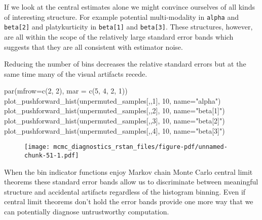 \documentclass[
  letterpaper,
  DIV=11,
  numbers=noendperiod]{scrartcl}
\newenvironment{Shaded}{\begin{snugshade}}{\end{snugshade}}
\newcommand{\AttributeTok}[1]{\textcolor[rgb]{0.40,0.45,0.13}{#1}}
\newcommand{\DecValTok}[1]{\textcolor[rgb]{0.68,0.00,0.00}{#1}}
\newcommand{\FunctionTok}[1]{\textcolor[rgb]{0.28,0.35,0.67}{#1}}
\newcommand{\NormalTok}[1]{\textcolor[rgb]{0.00,0.23,0.31}{#1}}
\newcommand{\StringTok}[1]{\textcolor[rgb]{0.13,0.47,0.30}{#1}}
\begin{document}
If we look at the central estimates alone we might convince ourselves of
all kinds of interesting structure. For example potential multi-modality
in \texttt{alpha} and \texttt{beta{[}2{]}} and platykurticity in
\texttt{beta{[}1{]}} and \texttt{beta{[}3{]}}. These structures,
however, are all within the scope of the relatively large standard error
bands which suggests that they are all consistent with estimator noise.

Reducing the number of bins decreases the relative standard errors but
at the same time many of the visual artifacts recede.

\begin{Shaded}
\begin{Highlighting}[]
\FunctionTok{par}\NormalTok{(}\AttributeTok{mfrow=}\FunctionTok{c}\NormalTok{(}\DecValTok{2}\NormalTok{, }\DecValTok{2}\NormalTok{), }\AttributeTok{mar =} \FunctionTok{c}\NormalTok{(}\DecValTok{5}\NormalTok{, }\DecValTok{4}\NormalTok{, }\DecValTok{2}\NormalTok{, }\DecValTok{1}\NormalTok{))}
\FunctionTok{plot\_pushforward\_hist}\NormalTok{(unpermuted\_samples[,,}\DecValTok{1}\NormalTok{], }\DecValTok{10}\NormalTok{, }\AttributeTok{name=}\StringTok{"alpha"}\NormalTok{)}
\FunctionTok{plot\_pushforward\_hist}\NormalTok{(unpermuted\_samples[,,}\DecValTok{2}\NormalTok{], }\DecValTok{10}\NormalTok{, }\AttributeTok{name=}\StringTok{"beta[1]"}\NormalTok{)}
\FunctionTok{plot\_pushforward\_hist}\NormalTok{(unpermuted\_samples[,,}\DecValTok{3}\NormalTok{], }\DecValTok{10}\NormalTok{, }\AttributeTok{name=}\StringTok{"beta[2]"}\NormalTok{)}
\FunctionTok{plot\_pushforward\_hist}\NormalTok{(unpermuted\_samples[,,}\DecValTok{4}\NormalTok{], }\DecValTok{10}\NormalTok{, }\AttributeTok{name=}\StringTok{"beta[3]"}\NormalTok{)}
\end{Highlighting}
\end{Shaded}

\begin{figure}[H]

{\centering \texttt{[image: mcmc\_diagnostics\_rstan\_files/figure-pdf/unnamed-chunk-51-1.pdf]}

}

\end{figure}

When the bin indicator functions enjoy Markov chain Monte Carlo central
limit theorems these standard error bands allow us to discriminate
between meaningful structure and accidental artifacts regardless of the
histogram binning. Even if central limit theorems don't hold the error
bands provide one more way that we can potentially diagnose
untrustworthy computation.
\end{document}
